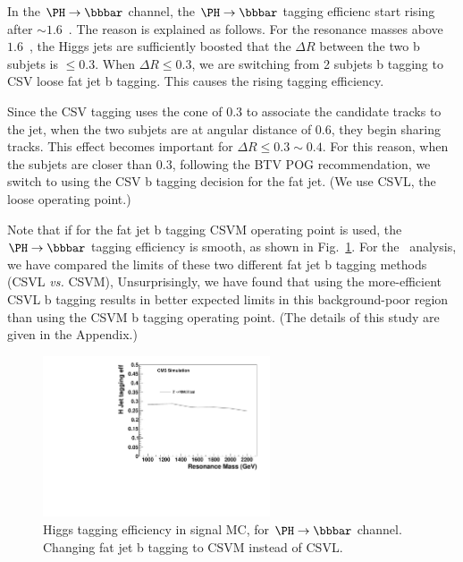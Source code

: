 In the $\Hbb$ channel, the $\Hbb$ tagging efficienc start rising 
after $\sim 1.6$~\TeVcc. The reason is explained as follows.  
For the resonance masses above $1.6$~\TeVcc, the Higgs
jets are sufficiently boosted that the $\Delta R$ between the two b
subjets is $\le 0.3$. When $\Delta R \leq 0.3$, we are switching from 2 subjets
b tagging to CSV loose fat jet b tagging.  This causes the rising tagging efficiency. 

Since the CSV tagging uses the cone of $0.3$ to
associate the candidate tracks to the jet, when the two subjets are at
angular distance of $0.6$, they begin sharing tracks. 
This effect becomes important for $\Delta R \le 0.3\sim0.4$.  For this
reason, when the subjets are closer than $0.3$, following the BTV POG
recommendation, we switch to using the CSV b tagging decision for the
fat jet. (We use CSVL, the loose operating point.)

Note that if for the fat jet b tagging CSVM operating point is used,
the $\Hbb$ tagging efficiency is smooth, as shown in
Fig.~\ref{fig:fatCSVM}.  For the \HbbZqq\ analysis, we have compared
the limits of these two different fat jet b tagging methods (CSVL 
{\it vs.} CSVM), Unsurprisingly, we have found that using the
more-efficient CSVL b tagging results in better expected limits in
this background-poor region than using the CSVM b tagging operating
point. (The details of this study are given in the Appendix.)



\begin{figure}[htb]
\begin{center}
\includegraphics[width=0.60\textwidth]{EXO-14-009/HbbZqqfigs/Signal/H-taggingEff-8TeV-CSVM.pdf}
\end{center}
\caption{
  Higgs tagging efficiency in signal MC, for $\Hbb$ channel.  
  Changing fat jet b tagging to CSVM instead of CSVL. 
}
\label{fig:fatCSVM}
\end{figure}

